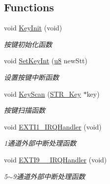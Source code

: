 \subsection*{\-Functions}
\begin{DoxyCompactItemize}
\item 
void \hyperlink{group___k_e_y_gae487e92ffd4829b2f098684a5e9b6738}{\-Key\-Init} (void)
\begin{DoxyCompactList}\small\item\em 按键初始化函数 \end{DoxyCompactList}\item 
void \hyperlink{group___k_e_y_gaee3a5acfe28e98d56137a5381fe731d2}{\-Set\-Key\-Int} (\hyperlink{group___b_s_p_gaed742c436da53c1080638ce6ef7d13de}{u8} new\-Stt)
\begin{DoxyCompactList}\small\item\em 设置按键中断函数 \end{DoxyCompactList}\item 
void \hyperlink{group___k_e_y_ga3270aa3bb293f0e41c049552f49b3f5c}{\-Key\-Scan} (\hyperlink{struct_s_t_r___key}{\-S\-T\-R\-\_\-\-Key} $\ast$key)
\begin{DoxyCompactList}\small\item\em 按键扫描函数 \end{DoxyCompactList}\item 
void \hyperlink{group___k_e_y_ga49cfdd46eb8d0ef3e1987514aa9343dc}{\-E\-X\-T\-I1\-\_\-\-I\-R\-Q\-Handler} (void)
\begin{DoxyCompactList}\small\item\em 1通道外部中断处理函数 \end{DoxyCompactList}\item 
void \hyperlink{group___k_e_y_ga7b2096b8b2643286dc3a7e5110e5ae85}{\-E\-X\-T\-I9\-\_\-\_\-\-I\-R\-Q\-Handler} (void)
\begin{DoxyCompactList}\small\item\em 5$\sim$9通道外部中断处理函数 \end{DoxyCompactList}\end{DoxyCompactItemize}

